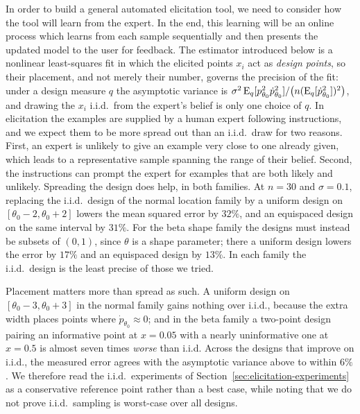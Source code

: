 In order to build a general automated elicitation tool, we need to consider how the tool will learn from the expert. In the end, this learning will be an online process which learns from each sample sequentially and then presents the updated model to the user for feedback. 
The estimator introduced below is a nonlinear least-squares fit in which the elicited points $x_i$ act as \emph{design points}, so their placement, and not merely their number, governs the precision of the fit: under a design measure $q$ the asymptotic variance is $\sigma^{2}\,\mathrm{E}_q[p_{\theta_0}^{2}\dot p_{\theta_0}^{2}]/\big(n(\mathrm{E}_q[\dot p_{\theta_0}^{2}])^{2}\big)$, and drawing the $x_i$ i.i.d.\ from the expert's belief is only one choice of $q$. In elicitation the examples are supplied by a human expert following instructions, and we expect them to be more spread out than an i.i.d.\ draw for two reasons. First, an expert is unlikely to give an example very close to one already given, which leads to a representative sample spanning the range of their belief. Second, the instructions can prompt the expert for examples that are both likely and unlikely. Spreading the design does help, in both families. At $n=30$ and $\sigma=0.1$, replacing the i.i.d.\ design of the normal location family by a uniform design on $[\theta_0-2,\theta_0+2]$ lowers the mean squared error by $32\%$, and an equispaced design on the same interval by $31\%$. For the beta shape family the designs must instead be subsets of $(0,1)$, since $\theta$ is a shape parameter; there a uniform design lowers the error by $17\%$ and an equispaced design by $13\%$. In each family the i.i.d.\ design is the least precise of those we tried.

Placement matters more than spread as such. A uniform design on $[\theta_0-3,\theta_0+3]$ in the normal family gains nothing over i.i.d., because the extra width places points where $\dot p_{\theta_0}\approx0$; and in the beta family a two-point design pairing an informative point at $x=0.05$ with a nearly uninformative one at $x=0.5$ is almost seven times \emph{worse} than i.i.d. Across the designs that improve on i.i.d., the measured error agrees with the asymptotic variance above to within $6\%$. We therefore read the i.i.d.\ experiments of Section~\ref{sec:elicitation-experiments} as a conservative reference point rather than a best case, while noting that we do not prove i.i.d.\ sampling is worst-case over all designs.


